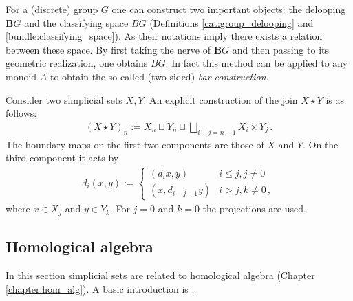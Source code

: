     \begin{property}
        For a (discrete) group $G$ one can construct two important objects: the delooping $\mathbf{B}G$ and the classifying space $BG$ (Definitions \ref{cat:group_delooping} and \ref{bundle:classifying_space}). As their notations imply there exists a relation between these space. By first taking the nerve of $\mathbf{B}G$ and then passing to its geometric realization, one obtains $BG$. In fact this method can be applied to any monoid $A$ to obtain the so-called (two-sided) \textit{bar construction}.
    \end{property}

    \begin{construct}[Join]
        Consider two simplicial sets $X,Y$. An explicit construction of the join $X\star Y$ is as follows:
        \begin{gather}
            (X\star Y)_n := X_n\sqcup Y_n\sqcup\bigsqcup_{i+j=n-1}X_i\times Y_j\,.
        \end{gather}
        The boundary maps on the first two components are those of $X$ and $Y$. On the third component it acts by
        \begin{gather}
            d_i(x,y) :=
            \begin{cases}
                (d_ix,y)&i\leq j,j\neq0\\
                (x,d_{i-j-1}y)&i>j,k\neq0\,,
            \end{cases}
        \end{gather}
        where $x\in X_j$ and $y\in Y_k$. For $j=0$ and $k=0$ the projections are used.
    \end{construct}

\subsection{Homological algebra}

    In this section simplicial sets are related to homological algebra (Chapter \ref{chapter:hom_alg}). A basic introduction is \cite{master2020homology}.

